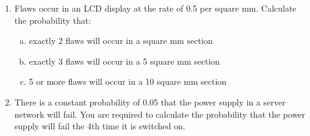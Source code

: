 \documentclass[a4paper,12pt]{article}
\begin{document}
\begin{enumerate}
\item Flaws occur in an LCD display at the rate of 0.5 per square mm.  Calculate the probability that:
\begin{enumerate}[(a)]
\item exactly 2 flaws will occur in a square mm section
\item exactly 3 flaws will occur in a 5 square mm section
\item 5 or more flaws will occur in a 10 square mm section
\end{enumerate}
\item There is a constant probability of 0.05 that the power supply in a server network will fail.  You are required to calculate the probability that the power supply will fail the 4th time it is switched on.

\end{enumerate}
\end{document}
